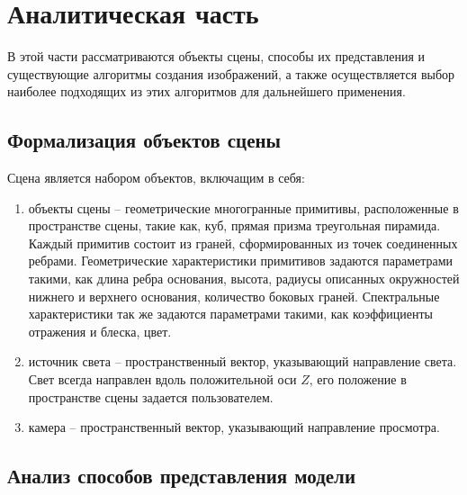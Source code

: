 \chapter{Аналитическая часть}

В этой части рассматриваются объекты сцены, способы их представления и существующие алгоритмы создания изображений, а также осуществляется выбор наиболее подходящих из этих алгоритмов для дальнейшего применения.

\section{Формализация объектов сцены}

Сцена является набором объектов, включащим в себя:

\begin{enumerate}
	\item объекты сцены -- геометрические многогранные примитивы, расположенные в пространстве сцены, такие как, куб, прямая призма треугольная пирамида. Каждый примитив состоит из граней, сформированных из точек соединенных ребрами. Геометрические характеристики примитивов задаются параметрами такими, как длина ребра основания, высота, радиусы описанных окружностей нижнего и верхнего основания, количество боковых граней. Спектральные характеристики так же задаются параметрами такими, как коэффициенты отражения и блеска, цвет.
	\item источник света -- пространственный вектор, указывающий направление света. Свет всегда направлен вдоль положительной оси $Z$, его положение в пространстве сцены задается пользователем.
	\item камера -- пространственный вектор, указывающий направление просмотра.
\end{enumerate}

\section{Анализ способов представления модели}

